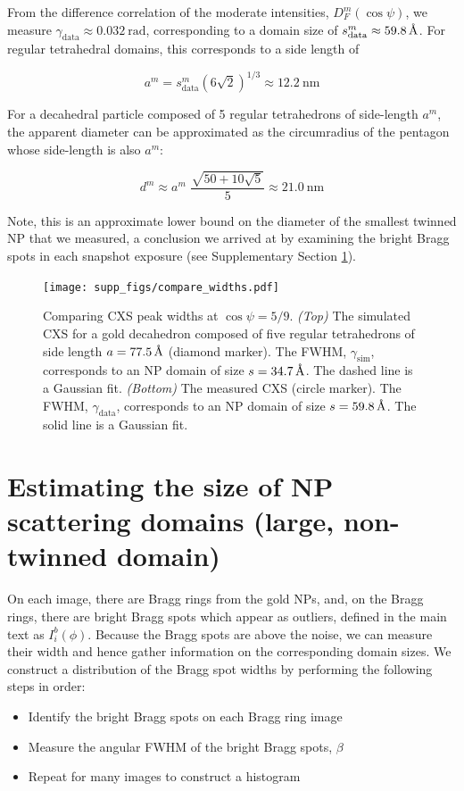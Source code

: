 \documentclass [12pt,fleqn]{article}
\newcommand{\angstrom}{\textup{\AA}}
\def \be {\begin{equation}}
\def \ee {\end{equation}}
\begin{document}
From the difference correlation of the moderate intensities, $D^m_F(\cos \psi)$, we measure $\gamma_{\text{data}} \approx \SI{0.032}{\radian}$, corresponding to a domain size of $s^m_{\text{data}} \approx \SI{59.8}{\angstrom}$. For regular tetrahedral domains, this corresponds to a side length of

\be \label{side_length}
a^m = s^m_{\text{data}} \left(6\sqrt{2}\right)^{1/3} \approx \SI{12.2} {\nm}
\ee

For a decahedral particle composed of 5 regular tetrahedrons of side-length $a^m$, the apparent diameter can be approximated as the circumradius of the pentagon whose side-length is also $a^m$:

\be
d^m \approx a^m\,\,\frac{\sqrt{50 + 10\sqrt{5}}}{5}  \approx \SI{21.0}{\nm}
\ee   

Note, this is an approximate lower bound on the diameter of the smallest twinned NP that we measured, a conclusion we arrived at by examining the bright Bragg spots in each snapshot exposure (see Supplementary Section \ref{widths_large}).
 
\begin{figure}[H]
\texttt{[image: supp\_figs/compare\_widths.pdf]}
\caption{Comparing CXS peak widths at $\cos \psi = 5/9$. \emph{(Top)} The simulated CXS for a gold decahedron composed of five regular tetrahedrons of side length $a= \SI{77.5}{\angstrom}$ (diamond marker). The FWHM, $\gamma_{\text{sim}}$, corresponds to an NP domain of size $s=\SI{34.7}{\angstrom}$. The dashed line is a Gaussian fit. \emph{(Bottom)} The measured CXS (circle marker). The FWHM, $\gamma_{\text{data}}$, corresponds to an NP domain of size $s=\SI{59.8}{\angstrom}$. The solid line is a Gaussian fit.}
\label{compare_widths}
\end{figure}

\section{Estimating the size of NP scattering domains (large, non-twinned domain)} \label{widths_large}
On each image, there are Bragg rings from the gold NPs, and, on the Bragg rings, there are bright Bragg spots which appear as outliers, defined in the main text as $I^b_i(\phi)$. Because the Bragg spots are above the noise, we can measure their width and hence gather information on the corresponding domain sizes. We construct a distribution of the Bragg spot widths by performing the following steps in order:

\begin{itemize}
\item Identify the bright Bragg spots on each Bragg ring image
\item Measure the angular FWHM of the bright Bragg spots, $\beta$
\item Repeat for many images to construct a histogram
\end{itemize}
\end{document}
